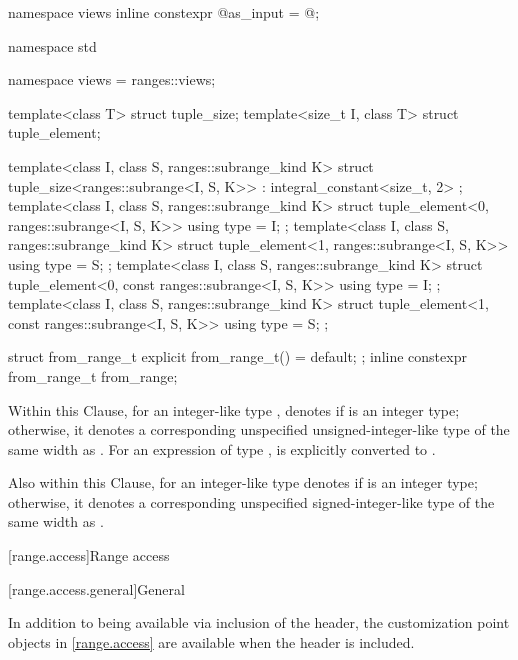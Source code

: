 \begin{codeblock}
{  namespace views { inline constexpr @\unspec@ as_input = @\unspec@; }
}

namespace std {
  namespace views = ranges::views;

  template<class T> struct tuple_size;
  template<size_t I, class T> struct tuple_element;

  template<class I, class S, ranges::subrange_kind K>
  struct tuple_size<ranges::subrange<I, S, K>>
    : integral_constant<size_t, 2> {};
  template<class I, class S, ranges::subrange_kind K>
  struct tuple_element<0, ranges::subrange<I, S, K>> {
    using type = I;
  };
  template<class I, class S, ranges::subrange_kind K>
  struct tuple_element<1, ranges::subrange<I, S, K>> {
    using type = S;
  };
  template<class I, class S, ranges::subrange_kind K>
  struct tuple_element<0, const ranges::subrange<I, S, K>> {
    using type = I;
  };
  template<class I, class S, ranges::subrange_kind K>
  struct tuple_element<1, const ranges::subrange<I, S, K>> {
    using type = S;
  };

  struct from_range_t { explicit from_range_t() = default; };
  inline constexpr from_range_t from_range{};
}
\end{codeblock}

\pnum
{}%
%
Within this Clause,
for an integer-like type ,
 denotes
 if  is an integer type;
otherwise, it denotes a corresponding unspecified unsigned-integer-like type
of the same width as .
For an expression  of type ,
 is
 explicitly converted to
.

\pnum
Also within this Clause,
 for an integer-like type 
denotes  if  is an integer type;
otherwise, it denotes a corresponding unspecified signed-integer-like type
of the same width as .

[range.access]{Range access}

[range.access.general]{General}

\pnum
In addition to being available via inclusion of the 
header, the customization point objects in \ref{range.access} are
available when the header  is included.

